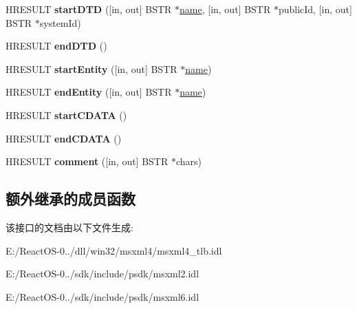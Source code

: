 \begin{DoxyCompactItemize}
H\+R\+E\+S\+U\+LT {\bfseries start\+D\+TD} (\mbox{[}in, out\mbox{]} B\+S\+TR $\ast$\hyperlink{structname}{name}, \mbox{[}in, out\mbox{]} B\+S\+TR $\ast$public\+Id, \mbox{[}in, out\mbox{]} B\+S\+TR $\ast$system\+Id)
\item 
\mbox{\label{interface_m_s_x_m_l2_1_1_i_v_b_s_a_x_lexical_handler_a13c57463536cff3611f415c6c849b865}} 
H\+R\+E\+S\+U\+LT {\bfseries end\+D\+TD} ()
\item 
\mbox{\label{interface_m_s_x_m_l2_1_1_i_v_b_s_a_x_lexical_handler_ab4feafb5e4d1f6e3b2f09828fc5771d9}} 
H\+R\+E\+S\+U\+LT {\bfseries start\+Entity} (\mbox{[}in, out\mbox{]} B\+S\+TR $\ast$\hyperlink{structname}{name})
\item 
\mbox{\label{interface_m_s_x_m_l2_1_1_i_v_b_s_a_x_lexical_handler_afc51519a1ea1746a5ea3128425f046e9}} 
H\+R\+E\+S\+U\+LT {\bfseries end\+Entity} (\mbox{[}in, out\mbox{]} B\+S\+TR $\ast$\hyperlink{structname}{name})
\item 
\mbox{\label{interface_m_s_x_m_l2_1_1_i_v_b_s_a_x_lexical_handler_aa97620e252521ce7efa16d69c94826f0}} 
H\+R\+E\+S\+U\+LT {\bfseries start\+C\+D\+A\+TA} ()
\item 
\mbox{\label{interface_m_s_x_m_l2_1_1_i_v_b_s_a_x_lexical_handler_a190fe5a696cd876e55df8bf2c6bf05e4}} 
H\+R\+E\+S\+U\+LT {\bfseries end\+C\+D\+A\+TA} ()
\item 
\mbox{\label{interface_m_s_x_m_l2_1_1_i_v_b_s_a_x_lexical_handler_a7b98e1a43862124dbae3a3a39eca6575}} 
H\+R\+E\+S\+U\+LT {\bfseries comment} (\mbox{[}in, out\mbox{]} B\+S\+TR $\ast$chars)
\end{DoxyCompactItemize}
\subsection*{额外继承的成员函数}


该接口的文档由以下文件生成\+:\begin{DoxyCompactItemize}
\item 
E\+:/\+React\+O\+S-\/0../dll/win32/msxml4/msxml4\+\_\+tlb.\+idl\item 
E\+:/\+React\+O\+S-\/0../sdk/include/psdk/msxml2.\+idl\item 
E\+:/\+React\+O\+S-\/0../sdk/include/psdk/msxml6.\+idl\end{DoxyCompactItemize}
